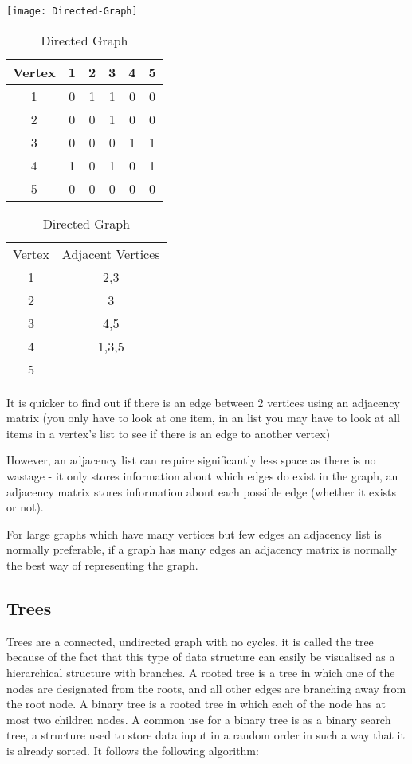   \texttt{[image: Directed-Graph]}
  
  \begin{table}[H]
  	\caption{Directed Graph}
  	\begin{tabular}{c | c c c c c}
  		Vertex	&	1	&	2	&	3	&	4	&	5 	\\ \hline
  		1		&	0	&	1	&	1	&	0	&	0	\\
  		2		&	0	&	0	&	1	&	0	&	0	\\
  		3		&	0	&	0	&	0	&	1	&	1	\\
  		4		&	1	&	0	&	1	&	0	&	1	\\
  		5		&	0	&	0	&	0	&	0	&	0	\\
  	\end{tabular}
  \end{table}
  \begin{table}[H]
  	\caption{Directed Graph}
  	\begin{tabular}{cc}
  		Vertex	&	Adjacent Vertices \\
  		1		&	2,3	\\
  		2		&	3	\\
  		3		&	4,5	\\
  		4		&	1,3,5	\\
  		5		&		\\
  	\end{tabular}
  \end{table}


  It is quicker to find out if there is an edge between 2 vertices using an adjacency matrix (you only have to look at one item, in an list you may have to look at all items in a vertex's list to see if there is an edge to another vertex)
  
  However, an adjacency list can require significantly less space as there is no wastage - it only stores information about which edges do exist in the graph, an adjacency matrix stores information about each possible edge (whether it exists or not).
  
  For large graphs which have many vertices but few edges an adjacency list is normally preferable, if a graph has many edges an adjacency matrix is normally the best way of representing the graph.
  
  
\subsection{Trees}
  
  Trees are a connected, undirected graph with no cycles, it is called the tree because of the fact that this type of data structure can easily be visualised as a hierarchical structure with branches. A rooted tree is a tree in which one of the nodes are designated from the roots, and all other edges are branching away from the root node. A binary tree is a rooted tree in which each of the node has at most two children nodes. A common use for a binary tree is as a binary search tree, a structure used to store data input in a random order in such a way that it is already sorted. It follows the following algorithm:
  
